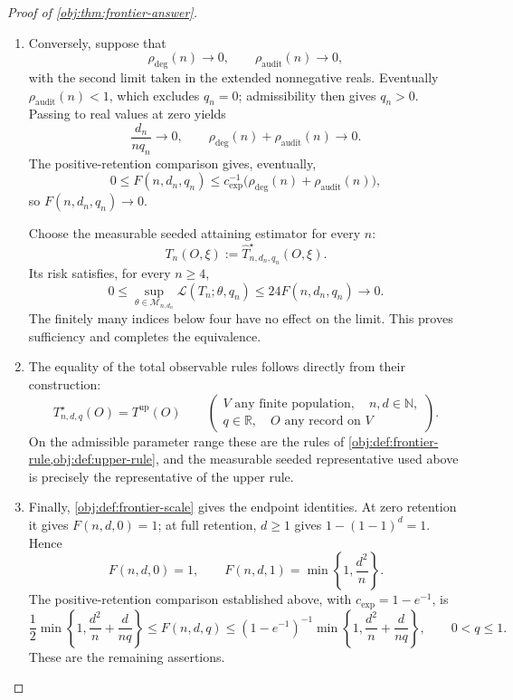 \documentclass[11pt]{article}
\begin{document}
\begin{proof}[Proof of \cref{obj:thm:frontier-answer}]
\begin{enumerate}
\item Conversely, suppose that
\[
\rho_{\mathrm{deg}}(n)\longrightarrow0,
\qquad
\rho_{\mathrm{audit}}(n)\longrightarrow0,
\]
with the second limit taken in the extended nonnegative reals. Eventually
\(\rho_{\mathrm{audit}}(n)<1\), which excludes \(q_n=0\); admissibility then gives
\(q_n>0\). Passing to real values at zero yields
\[
\frac{d_n}{nq_n}\longrightarrow0,
\qquad
\rho_{\mathrm{deg}}(n)+\rho_{\mathrm{audit}}(n)\longrightarrow0.
\]
The positive-retention comparison gives, eventually,
\[
0\le F(n,d_n,q_n)
\le c_{\mathrm{exp}}^{-1}
\bigl(\rho_{\mathrm{deg}}(n)+\rho_{\mathrm{audit}}(n)\bigr),
\]
so \(F(n,d_n,q_n)\to0\).

Choose the measurable seeded attaining estimator for every \(n\):
\[
T_n(O,\xi):=\widehat T^\star_{n,d_n,q_n}(O,\xi).
\]
Its risk satisfies, for every \(n\ge4\),
\[
0\le
\sup_{\theta\in\mathcal M_{n,d_n}}\mathcal L(T_n;\theta,q_n)
\le24F(n,d_n,q_n)\longrightarrow0.
\]
The finitely many indices below four have no effect on the limit. This proves sufficiency and completes the equivalence.

\item The equality of the total observable rules follows directly from their construction:
\[
T^\star_{n,d,q}(O)=T^{\mathrm{up}}(O)
\qquad
\left(
\begin{array}{l}
V\text{ any finite population},\quad n,d\in\mathbb N,\\
q\in\mathbb R,\quad O\text{ any record on }V
\end{array}
\right).
\]
On the admissible parameter range these are the rules of
\cref{obj:def:frontier-rule,obj:def:upper-rule}, and the measurable seeded representative used above is precisely the representative of the upper rule.

\item Finally, \cref{obj:def:frontier-scale} gives the endpoint identities. At zero retention it gives \(F(n,d,0)=1\); at full retention, \(d\ge1\) gives \(1-(1-1)^d=1\). Hence
\[
F(n,d,0)=1,
\qquad
F(n,d,1)=\min\left\{1,\frac{d^2}{n}\right\}.
\]
The positive-retention comparison established above, with
\(c_{\mathrm{exp}}=1-e^{-1}\), is
\[
\frac12\min\left\{1,\frac{d^2}{n}+\frac{d}{nq}\right\}
\le F(n,d,q)
\le
(1-e^{-1})^{-1}
\min\left\{1,\frac{d^2}{n}+\frac{d}{nq}\right\},
\qquad 0<q\le1.
\]
These are the remaining assertions.
\end{enumerate}
\end{proof}




\end{document}

